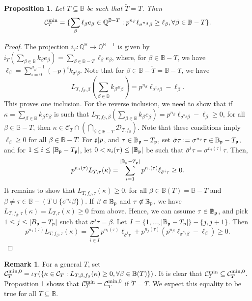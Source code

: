 \documentclass[11pt,pdflatex]{amsart}
\theoremstyle{plain}
\theoremstyle{definition}
\newtheorem{remark}[theorem]{Remark}
\newcommand{\QQ}{\mathbf{Q}}
\theoremstyle{plain}
\newtheorem{prop}[theorem]{Proposition}
\theoremstyle{definition}
\theoremstyle{remark}
\numberwithin{equation}{section}
\numberwithin{figure}{section} \numberwithin{table}{subsection}
\newcommand{\gerp}{{\frak{p}}}
\newcommand{\calC}{{\mathcal{C}}}
\newcommand{\calD}{{\mathcal{D}}}
\def\BB{\mathbb{B}}
\def\QQ{\mathbb{Q}}
\def\TT{\mathbb{T}}
\begin{document}
\begin{prop} \label{prop: diagonal} Let $T \subseteq \BB$ be such that $\tilde{T}=T$. Then $$\calC^{\rm min}_T=\{\sum_\beta \ell_\beta e_\beta \in \QQ^{\BB-T}: p^{n_\beta} \ell_{\sigma^{n_\beta}\beta} \geq \ell_\beta, \forall \beta \in \BB-T\}.$$
 \end{prop}
 
 \begin{proof} The projection $i_T: \QQ^\BB \rightarrow \QQ^{\BB-\TT}$ is given by $i_T(\sum_{\beta\in\BB} k_\beta e_\beta)=\sum_{\beta \in \BB-T} \ell_\beta e_\beta$, where, for $\beta \in \BB-T$, we have $\ell_\beta=\sum_{i=0}^{\mu_\beta-1} (-p)^i k_{\sigma^i\beta}$. Note that  for $\beta \in \BB-\tilde{T}=\BB-T$,  we have $$L_{T,f_\beta,\beta}(\sum_{\beta\in\BB} k_\beta e_\beta )=p^{n_\beta} \ell_{\sigma^{n_\beta}\beta} - \ell_\beta.$$ This proves one inclusion.  For the reverse inclusion, we need to show that if $\kappa=\sum_{\beta\in\BB} k_\beta e_\beta$ is such that $L_{T,f_\beta,\beta}(\sum_{\beta\in\BB} k_\beta e_\beta )=p^{n_\beta} \ell_{\sigma^{n_\beta}\beta} - \ell_\beta \geq 0$, for all $\beta \in \BB-T$, then $\kappa \in \calC_T \cap (\bigcap_{\beta \in \BB-T}  \calD_{T,f_\beta})$. Note that these conditions imply $\ell_\beta \geq 0$ for all $\beta \in \BB-T$. For $\gerp|p$, and  $\tau \in \BB_\gerp-T_\gerp$, set $\bar{\sigma}\tau:=\sigma^{n_\tau}\tau\in \BB_\gerp-T_\gerp$, and for $1 \leq i \leq |\BB_\gerp-T_\gerp|$, let  $0 < n_i(\tau) \leq |\BB_\gerp|$ be such that $\bar{\sigma}^i\tau=\sigma^{n_i(\tau)}\tau$. Then,   $$p^{n_1(\tau)}L_{T,\tau}(\kappa)=\sum_{i=1}^{|\BB_\gerp-T_\gerp|} p^{n_i(\tau)}\ell_{\bar{\sigma}^i\tau} \geq 0.$$
 It remains to show that $L_{T,f_\beta, \tau}(\kappa)\geq0$, for all $\beta \in \BB(T)=\BB-T$ and $\beta \neq \tau \in \BB-(T\cup\{\sigma^{n_\beta}\beta\})$. If $\beta \in \BB_\gerp$ and $\tau\not\in \BB_\gerp$, we have  $L_{T,f_\beta, \tau}(\kappa)=L_{T,\tau}(\kappa) \geq 0$ from above. Hence, we can assume $\tau \in \BB_\gerp$, and pick $1\leq j \leq |B_\gerp-T_\gerp|$ such that $\bar{\sigma}^j\tau=\beta$. Let $I=\{1,...,|\BB_\gerp-T_\gerp|\}-\{j, j+1\}$. Then 
 $$ p^{n_1(\tau)}L_{T,f_\beta,\tau}(\kappa)=\sum_{i\in I} p^{n_i(\tau)}\ell_{\bar{\sigma}^i\tau} + p^{n_j(\tau)}(p^{n_\beta} \ell_{\sigma^{n_\beta}\beta} - \ell_\beta) \geq 0.$$
 
 \end{proof}
 
 \begin{remark} For a general $T$, set $\calC_T^{{\rm min},0}=\iota_T(\{\kappa \in \calC_T: L_{T,\beta,f_\beta}(\kappa) \geq 0, \forall \beta \in \BB(T)\})$. It is clear that $\calC_T^{{\rm min}} \subseteq \calC_T^{{\rm min},0}$. Proposition \ref{prop: diagonal} shows that $\calC_T^{{\rm min}} =\calC_T^{{\rm min},0}$ if $\tilde{T}=T$.  We expect this equality to be true for all $T\subseteq \BB$.
 \end{remark}
\end{document}

